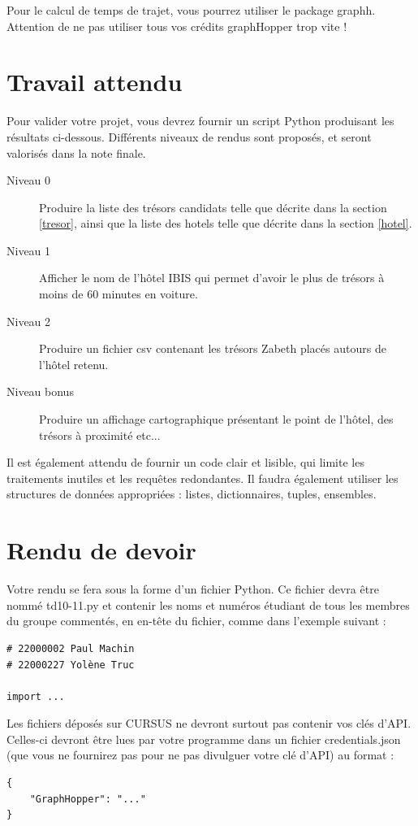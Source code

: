 \documentclass[11pt,a4paper]{article}
\begin{document}
Pour le calcul de temps de trajet, vous pourrez utiliser le package graphh. Attention de ne pas utiliser tous vos crédits graphHopper trop vite !
\section{Travail attendu}

Pour valider votre projet, vous devrez fournir un script Python produisant les résultats ci-dessous.
 Différents niveaux de rendus sont proposés, et seront valorisés dans la note finale. 

\begin{description}
    \item [Niveau 0] Produire la liste des trésors candidats telle que décrite dans la section \ref{tresor}, ainsi que la liste des hotels telle que décrite dans la section \ref{hotel}.
    \item[Niveau 1] Afficher le nom de l'hôtel IBIS qui permet d'avoir le plus de trésors à moins de 60 minutes en voiture. 
    \item[Niveau 2] Produire un fichier csv contenant les trésors Zabeth placés autours de l'hôtel retenu.
    \item[Niveau bonus] Produire un affichage cartographique présentant le point de l'hôtel, des trésors à proximité etc...
\end{description}

Il est également attendu de fournir un code clair et lisible, qui limite les traitements inutiles et les requêtes redondantes. Il faudra également utiliser les structures de données appropriées :  listes, dictionnaires, tuples, ensembles.

\section{Rendu de devoir}
Votre rendu se fera sous la forme d’un
fichier Python. Ce fichier devra être nommé td10-11.py et contenir les noms et numéros étudiant de tous
les membres du groupe commentés, en en-tête du fichier, comme dans l’exemple suivant :
\begin{verbatim}
# 22000002 Paul Machin
# 22000227 Yolène Truc

import ...
\end{verbatim}
Les fichiers déposés sur CURSUS ne devront surtout pas contenir vos clés d’API. Celles-ci devront être lues par votre programme dans un fichier credentials.json (que vous ne fournirez pas pour ne pas divulguer votre clé d’API) au format :
\begin{verbatim}
{
    "GraphHopper": "..."
}
\end{verbatim}
\end{document}
